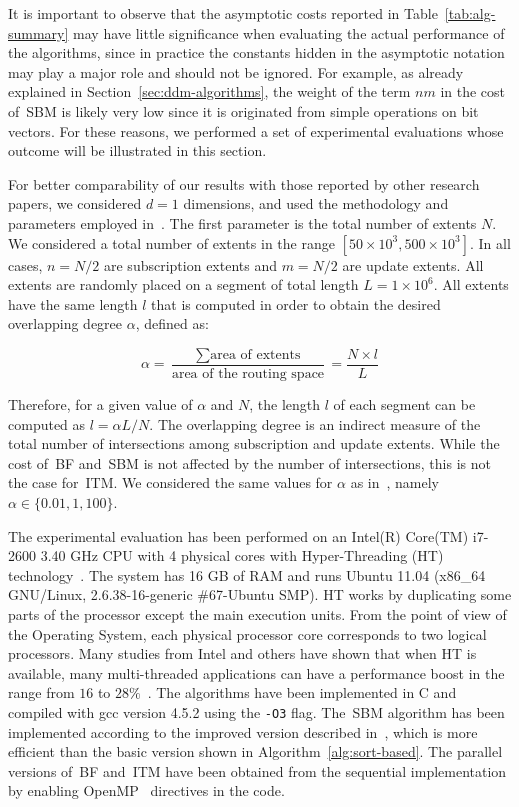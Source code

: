\documentclass[10pt, conference, compsocconf]{IEEEtran}
\begin{document}
It is important to observe that the asymptotic costs reported in
Table~\ref{tab:alg-summary} may have little significance when
evaluating the actual performance of the algorithms, since in practice
the constants hidden in the asymptotic notation may play a major role
and should not be ignored. For example, as already explained in
Section~\ref{sec:ddm-algorithms}, the weight of the term $nm$ in the
cost of~\ac{SBM} is likely very low since it is originated from simple
operations on bit vectors. For these reasons, we performed a set of
experimental evaluations whose outcome will be illustrated in this
section.

For better comparability of our results with those reported by other
research papers, we considered $d=1$ dimensions, and used the
methodology and parameters employed in~\cite{Raczy2005}. The first
parameter is the total number of extents $N$. We considered a total
number of extents in the range $[50 \times 10^3, 500 \times 10^3]$. In
all cases, $n = N/2$ are subscription extents and $m = N/2$ are update
extents. All extents are randomly placed on a segment of total length
$L=1 \times 10^6$. All extents have the same length $l$ that is
computed in order to obtain the desired overlapping degree $\alpha$,
defined as:

\begin{equation*}
\alpha=\frac{\sum \mbox{area of extents}}{\mbox{area of the routing space}} = \frac{N \times l}{L}
\end{equation*}

Therefore, for a given value of $\alpha$ and $N$, the length $l$ of
each segment can be computed as $l = \alpha L / N$. The overlapping
degree is an indirect measure of the total number of intersections
among subscription and update extents. While the cost of~\ac{BF}
and~\ac{SBM} is not affected by the number of intersections, this is not
the case for~\ac{ITM}. We considered the same values for $\alpha$ as
in~\cite{Raczy2005}, namely $\alpha \in \{0.01, 1, 100\}$.

The experimental evaluation has been performed on an Intel(R) Core(TM)
i7-2600 \@ 3.40 GHz CPU with 4 physical cores with Hyper-Threading
(HT) technology~\cite{HT}. The system has 16 GB of RAM and runs Ubuntu
11.04 (x86\_64 GNU/Linux, 2.6.38-16-generic \#67-Ubuntu SMP). HT works
by duplicating some parts of the processor except the main execution
units. From the point of view of the Operating System, each physical
processor core corresponds to two logical processors. Many studies
from Intel and others have shown that when HT is available, many
multi-threaded applications can have a performance boost in the range
from $16$ to $28\%$~\cite{HT}.  The algorithms have been implemented
in C and compiled with gcc version 4.5.2 using the \verb+-O3+
flag. The~\ac{SBM} algorithm has been implemented according to the
improved version described in~\cite[Section 4.2]{Raczy2005}, which is
more efficient than the basic version shown in
Algorithm~\ref{alg:sort-based}. The parallel versions of~\ac{BF}
and~\ac{ITM} have been obtained from the sequential implementation by
enabling OpenMP~\cite{openMP} directives in the code.
\end{document}
